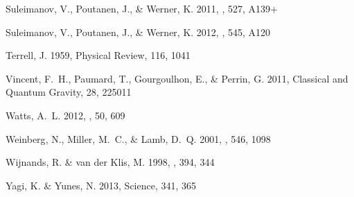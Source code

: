\documentclass{aa}
\begin{document}
\begin{thebibliography}{63}
{Suleimanov}, V., {Poutanen}, J., \& {Werner}, K. 2011, \aap, 527, A139+

{Suleimanov}, V., {Poutanen}, J., \& {Werner}, K. 2012, \aap, 545, A120

{Terrell}, J. 1959, Physical Review, 116, 1041

{Vincent}, F.~H., {Paumard}, T., {Gourgoulhon}, E., \& {Perrin}, G. 2011,
  Classical and Quantum Gravity, 28, 225011

{Watts}, A.~L. 2012, \araa, 50, 609

{Weinberg}, N., {Miller}, M.~C., \& {Lamb}, D.~Q. 2001, \apj, 546, 1098

{Wijnands}, R. \& {van der Klis}, M. 1998, \nat, 394, 344

{Yagi}, K. \& {Yunes}, N. 2013, Science, 341, 365


\end{thebibliography}
\end{document}
